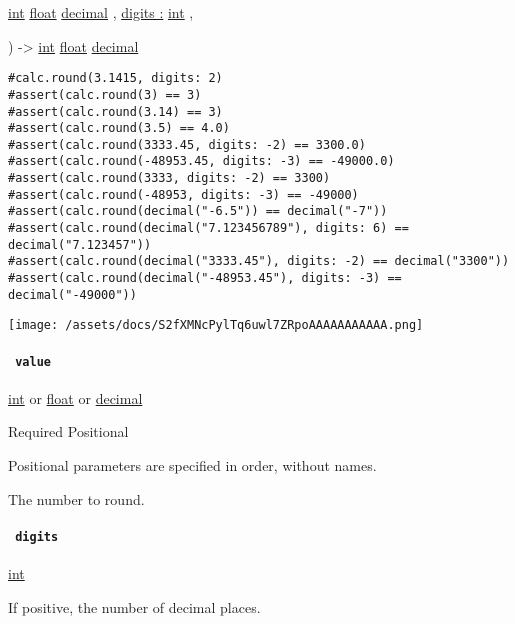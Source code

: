 { \href{/docs/reference/foundations/int/}{int}
\href{/docs/reference/foundations/float/}{float}
\href{/docs/reference/foundations/decimal/}{decimal} , } {
\hyperref[functions-round-parameters-digits]{digits :}
\href{/docs/reference/foundations/int/}{int} , }

) -\textgreater{} \href{/docs/reference/foundations/int/}{int}
\href{/docs/reference/foundations/float/}{float}
\href{/docs/reference/foundations/decimal/}{decimal}

\begin{verbatim}
#calc.round(3.1415, digits: 2)
#assert(calc.round(3) == 3)
#assert(calc.round(3.14) == 3)
#assert(calc.round(3.5) == 4.0)
#assert(calc.round(3333.45, digits: -2) == 3300.0)
#assert(calc.round(-48953.45, digits: -3) == -49000.0)
#assert(calc.round(3333, digits: -2) == 3300)
#assert(calc.round(-48953, digits: -3) == -49000)
#assert(calc.round(decimal("-6.5")) == decimal("-7"))
#assert(calc.round(decimal("7.123456789"), digits: 6) == decimal("7.123457"))
#assert(calc.round(decimal("3333.45"), digits: -2) == decimal("3300"))
#assert(calc.round(decimal("-48953.45"), digits: -3) == decimal("-49000"))
\end{verbatim}

\texttt{[image: /assets/docs/S2fXMNcPylTq6uwl7ZRpoAAAAAAAAAAA.png]}

\paragraph{\texorpdfstring{\texttt{\ value\ }}{ value }}\label{functions-round-value}

\href{/docs/reference/foundations/int/}{int} {or}
\href{/docs/reference/foundations/float/}{float} {or}
\href{/docs/reference/foundations/decimal/}{decimal}

{Required} {{ Positional }}

\label{functions-round-value-positional-tooltip}
Positional parameters are specified in order, without names.

The number to round.

\paragraph{\texorpdfstring{\texttt{\ digits\ }}{ digits }}\label{functions-round-digits}

\href{/docs/reference/foundations/int/}{int}

If positive, the number of decimal places.

